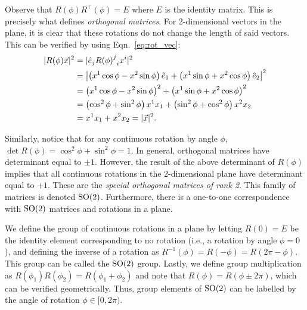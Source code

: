 \begin{example}
    Observe that $R(\phi)R^\top(\phi) = E$ where $E$ is the identity matrix. This is precisely what defines \textit{orthogonal matrices}. For 2-dimensional vectors in the plane, it is clear that these rotations do not change the length of said vectors. This can be verified by using Eqn.~\ref{eq:rot_vec}:
    \begin{align}
        |R(\phi)\vec{x}|^2 &= |\hat{e}_j{{R(\phi)}^j}_i x^i|^2 \\
        &= \left|\left( x^1\cos\phi - x^2\sin\phi \right)\hat{e}_1 + \left( x^1\sin\phi + x^2\cos\phi \right)\hat{e}_2\right|^2 \nonumber \\
        &= {\left( x^1\cos\phi - x^2\sin\phi \right)}^2 + {\left( x^1\sin\phi + x^2\cos\phi \right)}^2 \nonumber \\
        &= \left( \cos^2\phi + \sin^2\phi \right)x^1 x_1 + \left( \sin^2\phi + \cos^2\phi \right)x^2 x_2 \nonumber \\
        &= x^1 x_1 + x^2 x_2 = |\vec{x}|^2. \nonumber
    \end{align}

    Similarly, notice that for any continuous rotation by angle $\phi$, $\det R(\phi) = \cos^2\phi+\sin^2\phi = 1$. In general, orthogonal matrices have determinant equal to $\pm1$. However, the result of the above determinant of $R(\phi)$ implies that all continuous rotations in the 2-dimensional plane have determinant equal to $+1$. These are the \textit{special orthogonal matrices of rank 2}. This family of matrices is denoted $\textrm{SO}{(2)}$. Furthermore, there is a one-to-one correspondence with $\textrm{SO}{(2)}$ matrices and rotations in a plane.

    We define the group of continuous rotations in a plane by letting $R(0) = E$ be the identity element corresponding to no rotation (i.e., a rotation by angle $\phi=0$), and defining the inverse of a rotation as $R^{-1}(\phi) = R(-\phi) = R(2\pi-\phi)$. This group can be called the $\textrm{SO}{(2)}$ group. Lastly, we define group multiplication as $R(\phi_1)R(\phi_2) = R(\phi_1+\phi_2)$ and note that $R(\phi) = R(\phi\pm2\pi)$, which can be verified geometrically. Thus, group elements of $\textrm{SO}{(2)}$ can be labelled by the angle of rotation $\phi\in[0,2\pi)$.


\end{example}

